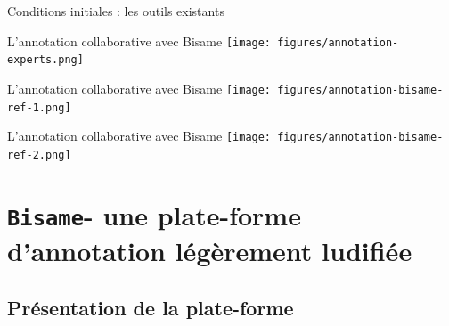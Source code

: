 \documentclass[french]{beamer}
\newcommand{\tool}[1]{\texttt{#1}\xspace}
\begin{document}
\begin{frame}{Conditions initiales : les outils existants}

\end{frame}


\begin{frame}{L'annotation collaborative avec Bisame}
    \centering
    \texttt{[image: figures/annotation-experts.png]}
    \hfill\cite{Fort2012} 
\end{frame}

\begin{frame}{L'annotation collaborative avec Bisame}
    \centering
    \texttt{[image: figures/annotation-bisame-ref-1.png]}
    \hfill\cite{Fort2012}
\end{frame}


\begin{frame}{L'annotation collaborative avec Bisame}
    \centering
    \texttt{[image: figures/annotation-bisame-ref-2.png]}
    \hfill\cite{Fort2012} 
\end{frame}



\section{\tool{Bisame}\thinspace - une plate-forme d'annotation légèrement ludifiée}

\subsection{Présentation de la plate-forme}
\end{document}
